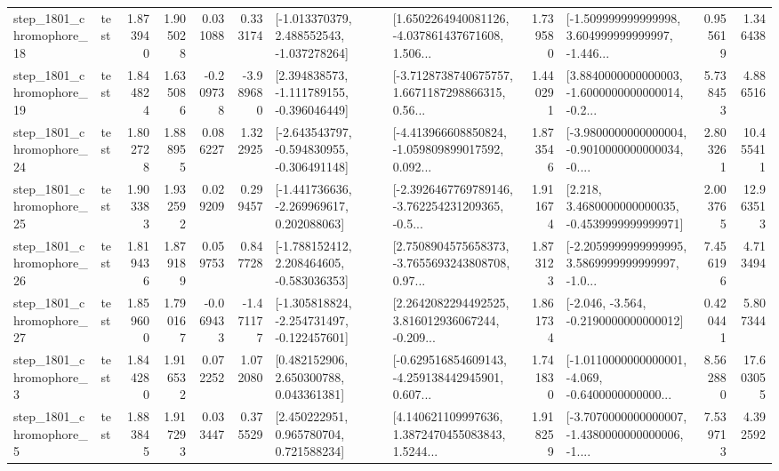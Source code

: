 \begin{tabular}{llrrrrllrlrr}
 step\_1801\_chromophore\_18 &      test &      1.873940 &    1.905028 &      0.031088 &  0.333174 &   [-1.013370379, 2.488552543, -1.037278264] &  [1.6502264940081126, -4.037861437671608, 1.506... &       1.739580 &  [-1.509999999999998, 3.604999999999997, -1.446... &            0.955619 &          1.346438 \\
 step\_1801\_chromophore\_19 &      test &      1.844824 &    1.635086 &     -0.209738 & -3.989680 &   [2.394838573, -1.111789155, -0.396046449] &  [-3.7128738740675757, 1.6671187298866315, 0.56... &       1.440291 &  [3.8840000000000003, -1.6000000000000014, -0.2... &            5.738453 &          4.886516 \\
 step\_1801\_chromophore\_24 &      test &      1.802728 &    1.888955 &      0.086227 &  1.322925 &  [-2.643543797, -0.594830955, -0.306491148] &  [-4.413966608850824, -1.059809899017592, 0.092... &       1.873546 &  [-3.9800000000000004, -0.9010000000000034, -0.... &            2.803261 &         10.455411 \\
 step\_1801\_chromophore\_25 &      test &      1.903383 &    1.932592 &      0.029209 &  0.299457 &   [-1.441736636, -2.269969617, 0.202088063] &  [-2.3926467769789146, -3.762254231209365, -0.5... &       1.911674 &   [2.218, 3.4680000000000035, -0.4539999999999971] &            2.003765 &         12.963513 \\
 step\_1801\_chromophore\_26 &      test &      1.819436 &    1.879189 &      0.059753 &  0.847728 &   [-1.788152412, 2.208464605, -0.583036353] &  [2.7508904575658373, -3.7655693243808708, 0.97... &       1.873123 &  [-2.2059999999999995, 3.5869999999999997, -1.0... &            7.456196 &          4.713494 \\
 step\_1801\_chromophore\_27 &      test &      1.859600 &    1.790167 &     -0.069433 & -1.471177 &  [-1.305818824, -2.254731497, -0.122457601] &  [2.2642082294492525, 3.816012936067244, -0.209... &       1.861734 &              [-2.046, -3.564, -0.2190000000000012] &            0.420441 &          5.807344 \\
  step\_1801\_chromophore\_3 &      test &      1.844280 &    1.916532 &      0.072252 &  1.072080 &     [0.482152906, 2.650300788, 0.043361381] &  [-0.629516854609143, -4.259138442945901, 0.607... &       1.741830 &  [-1.0110000000000001, -4.069, -0.6400000000000... &            8.562880 &         17.603055 \\
  step\_1801\_chromophore\_5 &      test &      1.883845 &    1.917293 &      0.033447 &  0.375529 &     [2.450222951, 0.965780704, 0.721588234] &  [4.140621109997636, 1.3872470455083843, 1.5244... &       1.918259 &  [-3.7070000000000007, -1.4380000000000006, -1.... &            7.539713 &          4.392592 \\

\end{tabular}

